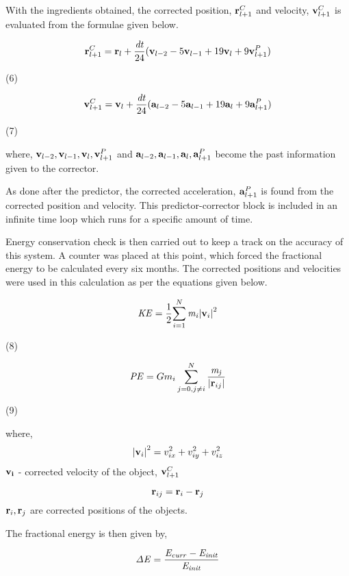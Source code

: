 \documentclass{article}
\begin{document}
{{With the ingredients obtained, the corrected position, ${\bf r}_{l+1}^C$ and velocity, ${\bf v}_{l+1}^C$ is evaluated from the formulae given below.
\smallskip

\[ {\bf r}_{l+1}^C = {\bf r}_l + \frac{{\it dt}} {24} ({\bf v}_{l-2} - 5{\bf v}_{l-1} + 19{\bf v}_l + 9{\bf v}_{l+1}^P) \]
\begin{flushright} (6) \end{flushright}

\[ {\bf v}_{l+1}^C = {\bf v}_l + \frac{{\it dt}} {24} ({\bf a}_{l-2} - 5{\bf a}_{l-1} + 19{\bf a}_l + 9{\bf a}_{l+1}^P) \]
\begin{flushright} (7) \end{flushright}

\smallskip

where,
\smallskip
${\bf v}_{l-2}, {\bf v}_{l-1}, {\bf v}_l, {\bf v}_{l+1}^P$ and ${\bf a}_{l-2}, {\bf a}_{l-1}, {\bf a}_l, {\bf a}_{l+1}^P$ become the past information given to the corrector.
\smallskip

As done after the predictor, the corrected acceleration, ${\bf a}_{l+1}^P$ is found from the corrected position and velocity. This predictor-corrector block is included in an infinite time loop which runs for a specific amount of time. 

Energy conservation check is then carried out to keep a track on the accuracy of this system. A counter was placed at this point, which forced the fractional energy to be calculated every six months. The corrected positions and velocities were used in this calculation as per the equations given below.

\[ {\it KE} = \frac{1}{2} { \sum_{i=1}^N {\it m_i} {\left| {\bf v}_i\right|}^2} \] 
\begin{flushright} (8) \end{flushright}

\[ {\it PE} = Gm_i \sum_{j=0,j \neq i}^{N} \frac{\it m_j}{\left| {\bf r}_{ij} \right|} \]
\begin{flushright} (9) \end{flushright}

where,
\[ {\left| {\bf v}_i \right|}^2 = v_{ix}^2 + v_{iy}^2 + v_{iz}^2 \]
${\bf v_i}$ - corrected velocity of the object, ${\bf v}_{l+1}^C$

\[ {\bf r}_{ij} = {\bf r}_i - {\bf r}_j \]
${\bf r}_i, {\bf r}_j$ are corrected positions of the objects.

The fractional energy is then given by,

\[ {\it \Delta E} = \frac{\it {E_{curr} - E_{init}}} {\it E_{init}} \]

}}
\end{document}

